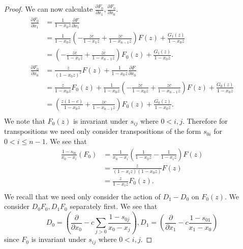 \documentclass{article}
\numberwithin{equation}{section}
\begin{document}
\begin{proof}
We can now calculate $\frac{\partial F_0}{\partial x_1},\frac{\partial F_0}{\partial x_0}$. 
\begin{align*}
\frac{\partial F_0}{\partial x_1}%
&=\frac{1}{1-x_0z}\frac{\partial F}{\partial x_1}\\
&=\frac{1}{1-x_0z}\left(-\frac{zc}{1-x_1z}+\frac{zc}{1-x_{n-1}z}\right)F(z)+\frac{G_1(z)}{1-x_0z}\\
&=\left(-\frac{zc}{1-x_1z}+\frac{zc}{1-x_{n-1}z}\right)F_0(z)+\frac{G_1(z)}{1-x_0z}.\\
\frac{\partial F_0}{\partial x_0}%
&=\frac{z}{(1-x_0z)^2}F(z)+\frac{1}{1-x_0z}\frac{\partial F}{\partial x_0}\\
&=\frac{z}{1-x_0z}F_0(z)+\frac{1}{1-x_0z}\left(-\frac{zc}{1-x_0z}+\frac{zc}{1-x_{n-1}z}\right)F(z)+\frac{G_0(z)}{1-x_0z}\\
&=\left(\frac{z(1-c)}{1-x_0z}+\frac{zc}{1-x_{n-1}z}\right)F_0(z)+\frac{G_0(z)}{1-x_0z}.\\
\end{align*}
We note that $F_0(z)$ is invariant under $s_{ij}$ where $0 < i,j$. Therefore for transpositions we need only consider transpositions of the form $s_{0i}$ for $0 < i \le n-1$. We see that 
\begin{align*}
\frac{1-s_{0i}}{x_0-x_i}(F_0)%
&=\frac{1}{x_0-x_i}\left(\frac{1}{1-x_0z}-\frac{1}{1-x_iz}\right)F(z)\\
&=\frac{z}{(1-x_iz)(1-x_0z)}F(z)\\
&=\frac{z}{1-x_iz}F_0(z).\\
\end{align*}
We recall that we need only consider the action of $D_1-D_0$ on $F_0(z)$. We consider $D_0F_0, D_1F_0$ separately first. We see that $$D_0=\left(\frac{\partial}{\partial x_0}-c\sum_{j > 0} \frac{1-s_{0j}}{x_0-x_j}\right), D_1=\left(\frac{\partial}{\partial x_1}-c \frac{1-s_{01}}{x_1-x_0}\right)$$ since $F_0$ is invariant under $s_{ij}$ where $0 < i,j$. 

\end{proof}
\end{document}

